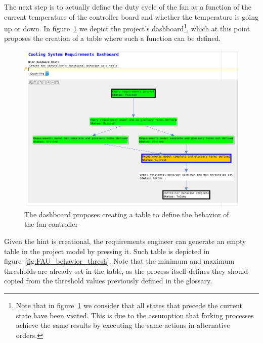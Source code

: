 The next step is to actually define the duty cycle of the fan as a function
of the current temperature of the controller board and whether the temperature
is going up or down. In figure~\ref{fig:FAU_behavior} we depict the project's
dashboard\footnote{Note that in figure~\ref{fig:FAU_behavior} we consider that
all states that precede the current state have been visited. This is due to the assumption
that forking processes achieve the same results by executing the same actions in
alternative orders.}, which at this point proposes the creation of a table where
such a function can be defined. 
\begin{figure}[!h] 
\centering 
\includegraphics[width=1\textwidth]{./figures/CreateTable.png}
\caption{The dashboard proposes creating a table to define the behavior of the
fan controller}
\label{fig:FAU_behavior}
\end{figure}
Given the hint is creational, the requirements engineer can generate an empty
table in the project model by pressing it. Such table is depicted in
figure~\ref{fig:FAU_behavior_thresh}.
Note that the minimum and maximum thresholds are already set in the table, as
the process itself defines they should copied from the threshold values
previously defined in the glossary.

